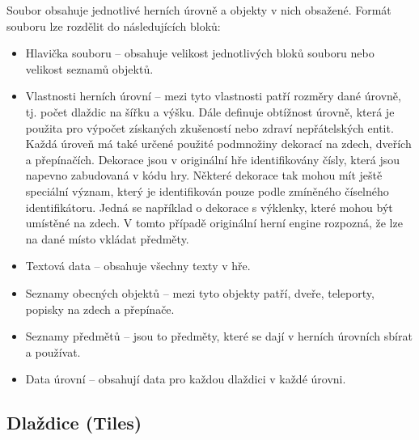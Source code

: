 Soubor  obsahuje jednotlivé herních úrovně a objekty v nich obsažené.
 Formát souboru lze rozdělit do následujících bloků: 
\begin{itemize}
\item Hlavička souboru -- obsahuje velikost jednotlivých bloků souboru nebo velikost seznamů objektů.
\item Vlastnosti herních úrovní -- mezi tyto vlastnosti patří rozměry dané úrovně, tj. počet dlaždic na šířku a výšku. Dále
	definuje obtížnost úrovně, která je použita pro výpočet získaných zkušeností nebo zdraví nepřátelských entit. Každá úroveň má
	také určené použité podmnožiny dekorací na zdech, dveřích a přepínačích. Dekorace jsou v originální hře identifikovány čísly, která
	jsou napevno zabudovaná v kódu hry. Některé dekorace tak mohou mít ještě speciální význam, který je identifikován
	pouze podle zmíněného číselného identifikátoru. Jedná se například o dekorace s výklenky, které mohou být umístěné na zdech.
	V tomto případě originální herní engine rozpozná, že lze na dané místo vkládat předměty. 
\item Textová data -- obsahuje všechny texty v hře.
\item Seznamy obecných objektů -- mezi tyto objekty patří, dveře, teleporty, popisky na zdech a přepínače.
\item Seznamy předmětů -- jsou to předměty, které se dají v herních úrovních sbírat a používat. 
\item Data úrovní -- obsahují data pro každou dlaždici v každé úrovni.
\end{itemize}


\subsection{Dlaždice (Tiles)}

